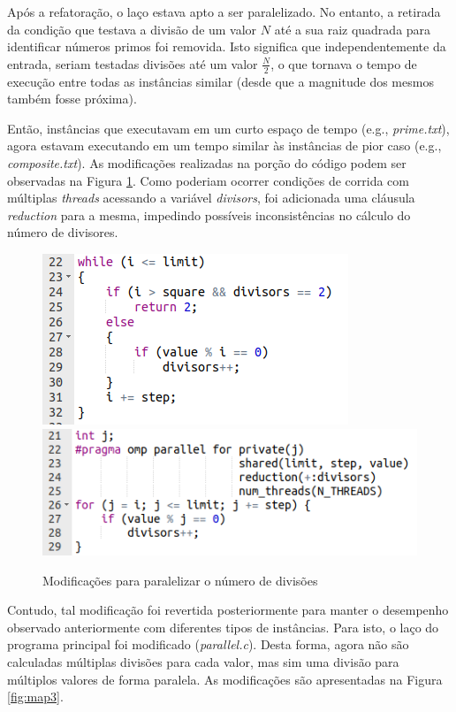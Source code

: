 \documentclass[a4paper, 12pt]{article}
\begin{document}
Após a refatoração, o laço estava apto a ser paralelizado. No entanto, a retirada da condição que testava a divisão de um valor \(N\) até a sua raiz quadrada para identificar números primos foi removida. Isto significa que independentemente da entrada, seriam testadas divisões até um valor \(\frac{N}{2}\), o que tornava o tempo de execução entre todas as instâncias similar (desde que a magnitude dos mesmos também fosse próxima). 

Então, instâncias que executavam em um curto espaço de tempo (e.g., \textit{prime.txt}), agora estavam executando em um tempo similar às instâncias de pior caso (e.g., \textit{composite.txt}). As modificações realizadas na porção do código podem ser observadas na Figura \ref{fig:map2}. Como poderiam ocorrer condições de corrida com múltiplas \emph{threads} acessando a variável \textit{divisors}, foi adicionada uma cláusula \textit{reduction} para a mesma, impedindo possíveis inconsistências no cálculo do número de divisores.

\begin{figure}[H]
    \centering
    \includegraphics[width=.45\textwidth]{Images/old.png}
    \includegraphics[width=.52\textwidth]{Images/new.png}
    \caption{Modificações para paralelizar o número de divisões}
    \label{fig:map2}
\end{figure}

Contudo, tal modificação foi revertida posteriormente para manter o desempenho observado anteriormente com diferentes tipos de instâncias. Para isto, o laço do programa principal foi modificado (\textit{parallel.c}). Desta forma, agora não são calculadas múltiplas divisões para cada valor, mas sim uma divisão para múltiplos valores de forma paralela. As modificações são apresentadas na Figura \ref{fig:map3}.
\end{document}
